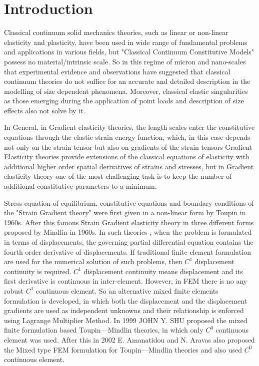 \documentclass[12pt]{article}
\begin{document}
    \newpage
    \clearpage
    \tableofcontents
    \clearpage

\section{Introduction}
Classical continuum solid mechanics theories, such as linear or non-linear elasticity and plasticity, have been used in wide range of fundamental problems and applications in various fields, but "Classical Continuum Constitutive Models" possess no material/intrinsic scale. So in this regime of micron and nano-scales that experimental evidence and observations have suggested that classical continuum theories do not suffice for an accurate and detailed description in the modelling of size dependent phenomena. Moreover, classical elastic singularities as those emerging during the application of point loads and description of size effects also not solve by it.
\newline
\par
In General, in Gradient elasticity theories, the length scales enter the constitutive equations through the elastic strain energy function, which, in this case depends not only on the strain tensor but also on gradients of the strain tensors Gradient Elasticity theories provide extensions of the classical equations of elasticity with additional higher order spatial derivatives of strains and stresses, but in Gradient elasticity theory one of the most challenging task is to keep the number of additional constitutive parameters to a minimum.
\newline
\par
Stress equation of equilibrium, constitutive equations and boundary conditions of the "Strain Gradient theory" were first given in a non-linear form by Toupin in 1960s. After this famous Strain Gradient elasticity theory in three different forms proposed by Mindlin in 1960s. In such theories , when the problem is formulated in terms of displacements, the governing partial differential equation contains the fourth order derivative of displacements. If traditional finite element formulation are used for the numerical solution of such problems, then $C^{1}$ displacement continuity is required. $C^{1}$ displacement continuity means displacement and its first derivative is continuous in inter-element. However, in FEM there is no any robust $C^{1}$ continuous element. So an alternative mixed finite elements formulation is developed, in which both the displacement and the displacement gradients are used as independent unknowns and their relationship is enforced using Lagrange Multiplier Method. In 1999 JOHN Y. SHU proposed the mixed finite formulation based Toupin—Mindlin theories, in which only $C^{0}$ continuous element was used. After this in 2002 E. Amanatidou and N. Aravas also proposed the Mixed type FEM formulation for Toupin—Mindlin theories and also used $C^{0}$ continuous element.
\end{document}
